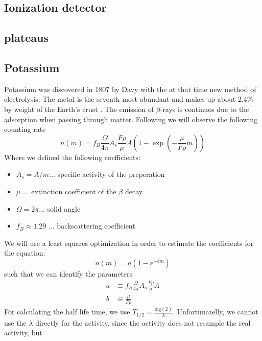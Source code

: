 \subsection{Ionization detector}
\label{subsec:detector}

\subsection{plateaus}
\label{subsec:plateaus}

\subsection{Potassium}
\label{subsec:potassium}
Potassium was discovered in 1807 by Davy with the at that time new method of electrolysis. The metal
is the seventh most abundant and makes up about 2.4\% by weight of the Earth's crust \cite{haynes}.
The emission of $\beta$-rays is continuos due to the adsorption when
passing through matter. Following \cite{ver} we will observe the following
counting rate
\begin{equation}
n(m) = f_B \frac{\Omega}{4 \pi} A_s \frac{F \rho }{\mu}A \left (1 - \exp \left ( - \frac{\mu}{F \rho}m \right ) \right )
\label{eq:potassium}
\end{equation}
Where we defined the following coefficients:
\begin{itemize}
\item[] $A_s = A/ m$... specific activity of the preperation  
\item[] $\mu$ ... extinction coefficient  of the $\beta$ decay 
\item[] $\Omega = 2 \pi$... solid angle
\item[] $f_B\approx 1.29$ ... backscattering coefficient 
\end{itemize}
We will use a least squares optimization in order to estimate the coefficients for the equation:
\begin{equation}
n(m) = a ( 1 - e^{-bm})
\end{equation}
such that we can identify the parameters
\begin{align}
a &\equiv  f_B \frac{\Omega}{4 \pi} A_s \frac{F \rho }{\mu}A  \label{eq:a}\\ 
b &\equiv \frac{\mu}{F \rho} \label{eq:b}
\end{align}
For calculating the half life time, we use $T_{1/2} = \frac{\mathrm{log}(2)}{\lambda}$. Unfortunatelly,
we cannot use the $\lambda$ directly for the activity, since the activity does not resample the real activity, but
